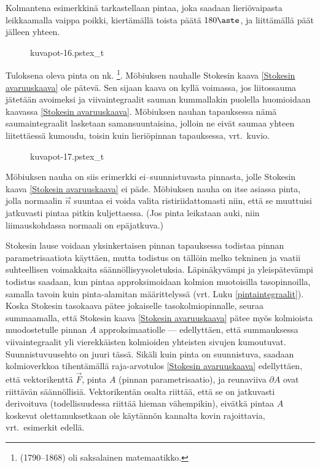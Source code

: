 \begin{Exa} Kolmantena esimerkkinä tarkastellaan pintaa, joka saadaan lieriövaipasta
leikkaamalla vaippa poikki, kiertämällä toista päätä $180\aste$, ja liittämällä päät jälleen
yhteen.
\begin{figure}[H]
\begin{center}
{kuvapot-16.pstex_t}
\end{center}
\end{figure}
%
Tuloksena oleva pinta on nk. \footnote[2]{ (1790--1868)
oli saksalainen matemaatikko. }. Möbiuksen nauhalle Stokesin kaava
\eqref{Stokesin avaruuskaava}  ole pätevä. Sen sijaan kaava on kyllä voimassa, jos
liitossauma jätetään avoimeksi ja viivaintegraalit sauman kummallakin puolella huomioidaan
kaavassa \eqref{Stokesin avaruuskaava}. Möbiuksen nauhan tapauksessa nämä saumaintegraalit
lasketaan samansuuntaisina, jolloin ne eivät saumaa yhteen liitettäessä kumoudu, toisin kuin
lieriöpinnan tapauksessa, vrt.\ kuvio.
\begin{figure}[H]
\begin{center}
{kuvapot-17.pstex_t}
\end{center}
\end{figure}
Möbiuksen nauha on siis erimerkki ei--suunnistuvasta pinnasta, jolle Stokesin kaava 
\eqref{Stokesin avaruuskaava} ei päde. Möbiuksen nauha on itse asiassa
%
 pinta, jolla normaalin $\vec n$ suuntaa ei voida valita ristiriidattomasti
niin, että se muuttuisi jatkuvasti pintaa pitkin kuljettaessa.
(Jos pinta leikataan auki, niin liimauskohdassa normaali on epäjatkuva.) \loppu
\end{Exa}

Stokesin lause voidaan yksinkertaisen pinnan tapauksessa todistaa pinnan parametrisaatiota
käyttäen, mutta todistus on tällöin melko tekninen ja vaatii suhteellisen voimakkaita
säännöllisyysoletuksia. Läpinäkyvämpi ja yleispätevämpi todistus saadaan, kun pintaa
approksimoidaan kolmion muotoisilla tasopinnoilla, samalla tavoin kuin pinta-alamitan
määrittelyssä (vrt. Luku \ref{pintaintegraalit}). Koska Stokesin tasokaava pätee jokaiselle
tasokolmiopinnalle, seuraa summaamalla, että Stokesin kaava \eqref{Stokesin avaruuskaava}
pätee myös kolmioista muodostetulle pinnan $A$ approksimaatiolle --- edellyttäen, että
summauksessa viivaintegraalit yli vierekkäisten kolmioiden yhteisten sivujen kumoutuvat.
Suunnistuvuusehto on juuri tässä. Sikäli kuin pinta on suunnistuva, saadaan kolmioverkkoa
tihentämällä raja-arvotulos \eqref{Stokesin avaruuskaava} edellyttäen, että vektorikenttä
$\vec F$, pinta $A$ (pinnan parametrisaatio), ja reunaviiva $\partial A$ ovat riittävän
säännöllisiä. Vektorikentän osalta riittää, että se on jatkuvasti derivoituva
(todellisuudessa riittää hieman vähempikin), eivätkä pintaa $A$ koskevat olettamuksetkaan ole
käytännön kannalta kovin rajoittavia, vrt.\ esimerkit edellä.

